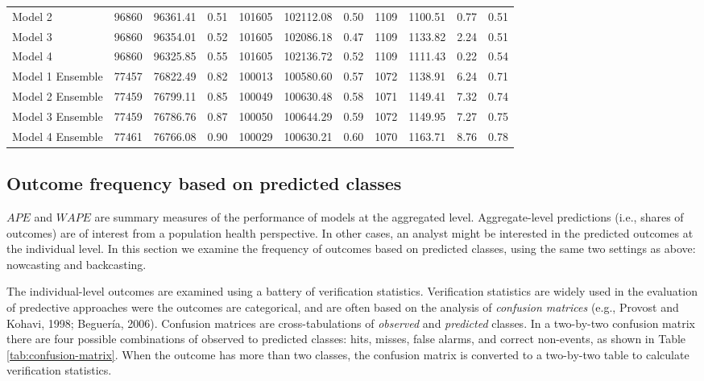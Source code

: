 \documentclass[]{elsarticle} %
\begin{document}
\begin{table}
\begin{tabular}[t]{lrrrrrrrrrr}
\rowcolor{gray!15}
\hspace{1em}Model 2 & 96860 & 96361.41 & 0.51 & 101605 & 102112.08 & 0.50 & 1109 & 1100.51 & 0.77 & 0.51\\
\hspace{1em}Model 3 & 96860 & 96354.01 & 0.52 & 101605 & 102086.18 & 0.47 & 1109 & 1133.82 & 2.24 & 0.51\\
\rowcolor{gray!15}
\hspace{1em}Model 4 & 96860 & 96325.85 & 0.55 & 101605 & 102136.72 & 0.52 & 1109 & 1111.43 & 0.22 & 0.54\\
\hspace{1em}Model 1 Ensemble & 77457 & 76822.49 & 0.82 & 100013 & 100580.60 & 0.57 & 1072 & 1138.91 & 6.24 & 0.71\\
\rowcolor{gray!15}
\hspace{1em}Model 2 Ensemble & 77459 & 76799.11 & 0.85 & 100049 & 100630.48 & 0.58 & 1071 & 1149.41 & 7.32 & 0.74\\
\hspace{1em}Model 3 Ensemble & 77459 & 76786.76 & 0.87 & 100050 & 100644.29 & 0.59 & 1072 & 1149.95 & 7.27 & 0.75\\
\rowcolor{gray!15}
Model 4 Ensemble & 77461 & 76766.08 & 0.90 & 100029 & 100630.21 & 0.60 & 1070 & 1163.71 & 8.76 & 0.78\\
\bottomrule
\end{tabular}
\end{table}

\hypertarget{outcome-frequency-based-on-predicted-classes}{%
\subsection{Outcome frequency based on predicted
classes}\label{outcome-frequency-based-on-predicted-classes}}

\(APE\) and \(WAPE\) are summary measures of the performance of models
at the aggregated level. Aggregate-level predictions (i.e., shares of
outcomes) are of interest from a population health perspective. In other
cases, an analyst might be interested in the predicted outcomes at the
individual level. In this section we examine the frequency of outcomes
based on predicted classes, using the same two settings as above:
nowcasting and backcasting.

The individual-level outcomes are examined using a battery of
verification statistics. Verification statistics are widely used in the
evaluation of predective approaches were the outcomes are categorical,
and are often based on the analysis of \emph{confusion matrices} (e.g.,
Provost and Kohavi, 1998; Beguería, 2006). Confusion matrices are
cross-tabulations of \emph{observed} and \emph{predicted} classes. In a
two-by-two confusion matrix there are four possible combinations of
observed to predicted classes: hits, misses, false alarms, and correct
non-events, as shown in Table \ref{tab:confusion-matrix}. When the
outcome has more than two classes, the confusion matrix is converted to
a two-by-two table to calculate verification statistics.
\end{document}
